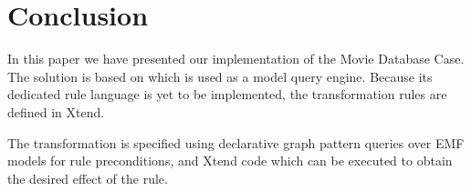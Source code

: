 \section{Conclusion}
\label{sec:conclusion}

In this paper we have presented our implementation of the Movie Database Case. The solution is based on \incquery{} which is used as a model query engine. Because its dedicated rule language is yet to be implemented, the transformation rules are defined in Xtend.

The transformation is specified using declarative graph pattern queries over EMF models for rule preconditions, and Xtend code which can be executed to obtain the desired effect of the rule.
